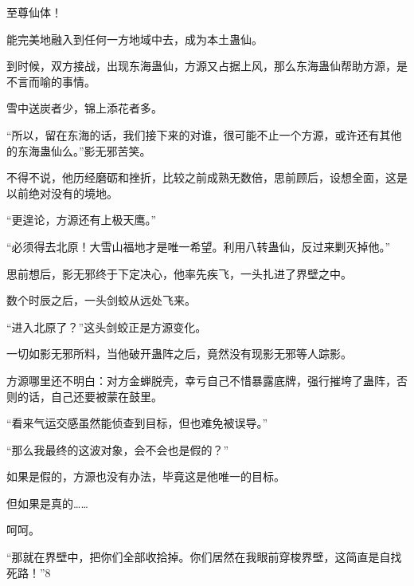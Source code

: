 \begin{this_body}
至尊仙体！

能完美地融入到任何一方地域中去，成为本土蛊仙。

到时候，双方接战，出现东海蛊仙，方源又占据上风，那么东海蛊仙帮助方源，是不言而喻的事情。

雪中送炭者少，锦上添花者多。

“所以，留在东海的话，我们接下来的对谁，很可能不止一个方源，或许还有其他的东海蛊仙么。”影无邪苦笑。

不得不说，他历经磨砺和挫折，比较之前成熟无数倍，思前顾后，设想全面，这是以前绝对没有的境地。

“更遑论，方源还有上极天鹰。”

“必须得去北原！大雪山福地才是唯一希望。利用八转蛊仙，反过来剿灭掉他。”

思前想后，影无邪终于下定决心，他率先疾飞，一头扎进了界壁之中。

数个时辰之后，一头剑蛟从远处飞来。

“进入北原了？”这头剑蛟正是方源变化。

一切如影无邪所料，当他破开蛊阵之后，竟然没有现影无邪等人踪影。

方源哪里还不明白：对方金蝉脱壳，幸亏自己不惜暴露底牌，强行摧垮了蛊阵，否则的话，自己还要被蒙在鼓里。

“看来气运交感虽然能侦查到目标，但也难免被误导。”

“那么我最终的这波对象，会不会也是假的？”

如果是假的，方源也没有办法，毕竟这是他唯一的目标。

但如果是真的……

呵呵。

“那就在界壁中，把你们全部收拾掉。你们居然在我眼前穿梭界壁，这简直是自找死路！”8

\end{this_body}

